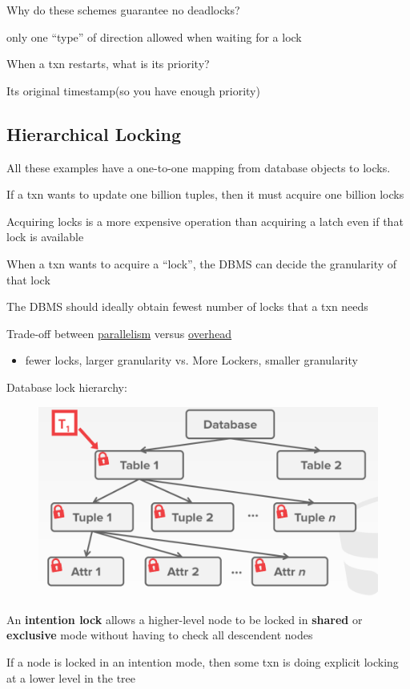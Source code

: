 \documentclass[11pt]{article}
\begin{document}
Why do these schemes guarantee no deadlocks?

only one ``type'' of direction allowed when waiting for a lock

When a txn restarts, what is its priority?

Its original timestamp(so you have enough priority)
\subsection{Hierarchical Locking}
\label{sec:orgc08856c}
All these examples have a one-to-one mapping from database objects to locks.

If a txn wants to update one billion tuples, then it must acquire one billion locks

Acquiring locks is a more expensive operation than acquiring a latch even if that lock is
available

When a txn wants to acquire a ``lock'', the DBMS can decide the granularity of that lock

The DBMS should ideally obtain fewest number of locks that a txn needs

Trade-off between \uline{parallelism} versus \uline{overhead}
\begin{itemize}
\item fewer locks, larger granularity vs. More Lockers, smaller granularity
\end{itemize}

Database lock hierarchy:
\begin{figure}[htbp]
\centering
\includegraphics[width=.8\textwidth]{../images/15445/63.png}
\label{}
\end{figure}


An \textbf{intention lock} allows a higher-level node to be locked in \textbf{shared} or \textbf{exclusive} mode without
having to check all descendent nodes

If a node is locked in an intention mode, then some txn is doing explicit locking at a lower
level in the tree
\end{document}
